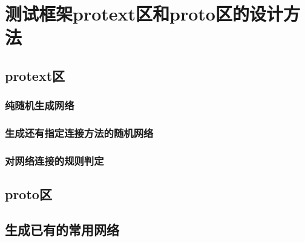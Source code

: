 ﻿\chapter{测试框架protext区和proto区的设计方法}

\section{protext区}

\subsection{纯随机生成网络}

\subsection{生成还有指定连接方法的随机网络}

\subsection{对网络连接的规则判定}

\section{proto区}

\section{生成已有的常用网络}
